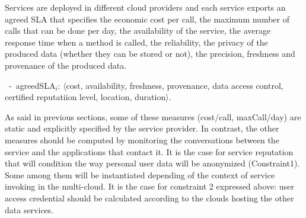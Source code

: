 
Services are deployed in different cloud providers and each service exports an agreed SLA that specifies the economic cost per call, the maximum number of calls that can be done per day, the availability of the service, the average response time when a method is called, the reliability, the privacy of the produced data (whether they can be stored or not), the precision, freshness and provenance of the produced data. 


\begin{trivlist}\sf\footnotesize
\item[~-~agreedSLA$_i$:] $\langle$cost, availability, freshness, provenance, data access control, certified reputatiion level, location, duration$\rangle$. 
 \end{trivlist}
 
As said in previous sections, some of these measures ({\sf cost/call, maxCall/day}) are static and explicitly specified by the service provider. 
In contrast, the other measures should be computed by monitoring the conversations between the service and the applications that contact it.  It is the case for service reputation that will condition the way personal user data will be anonymized (Constraint1).  Some among them will be instantiated depending of the context of service invoking in the multi-cloud. It is the case for constraint 2 expressed above:   user access credential should be calculated according to the clouds hosting the other data services.


